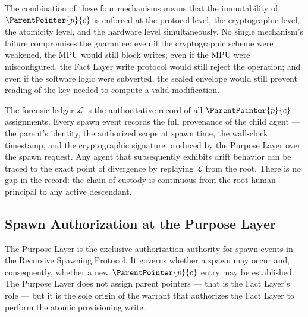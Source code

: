 The combination of these four mechanisms means that the immutability of $\ParentPointer{p}{c}$ is enforced at the protocol level, the cryptographic level, the atomicity level, and the hardware level simultaneously. No single mechanism's failure compromises the guarantee: even if the cryptographic scheme were weakened, the MPU would still block writes; even if the MPU were misconfigured, the Fact Layer write protocol would still reject the operation; and even if the software logic were subverted, the sealed envelope would still prevent reading of the key needed to compute a valid modification.

The forensic ledger $\mathcal{L}$ is the authoritative record of all $\ParentPointer{p}{c}$ assignments. Every spawn event records the full provenance of the child agent --- the parent's identity, the authorized scope at spawn time, the wall-clock timestamp, and the cryptographic signature produced by the Purpose Layer over the spawn request. Any agent that subsequently exhibits drift behavior can be traced to the exact point of divergence by replaying $\mathcal{L}$ from the root. There is no gap in the record: the chain of custody is continuous from the root human principal to any active descendant.

\subsection{Spawn Authorization at the Purpose Layer}
\label{sec:rs-spawn-authorization}

The Purpose Layer is the exclusive authorization authority for spawn events in the Recursive Spawning Protocol. It governs whether a spawn may occur and, consequently, whether a new $\ParentPointer{p}{c}$ entry may be established. The Purpose Layer does not assign parent pointers --- that is the Fact Layer's role --- but it is the sole origin of the warrant that authorizes the Fact Layer to perform the atomic provisioning write.

